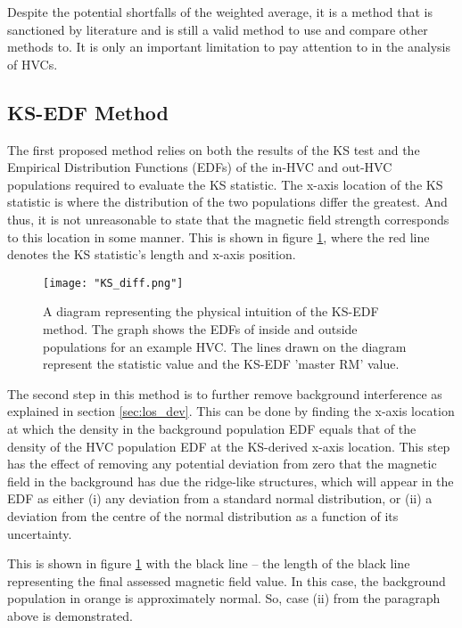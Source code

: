 Despite the potential shortfalls of the weighted average, it is a method that is sanctioned by literature and is still a valid method to use and compare other methods to. It is only an important limitation to pay attention to in the analysis of HVCs.


\subsection{KS-EDF Method}
\label{ssec:KS_EDF}

The first proposed method relies on both the results of the KS test and the Empirical Distribution Functions (EDFs) of the in-HVC and out-HVC populations required to evaluate the KS statistic. The x-axis location of the KS statistic is where the distribution of the two populations differ the greatest. And thus, it is not unreasonable to state that the magnetic field strength corresponds to this location in some manner. This is shown in figure \ref{fig:KSdiff}, where the red line denotes the KS statistic's length and x-axis position.


\begin{figure}
    \texttt{[image: "KS\_diff.png"]}
    \centering
    \caption{A diagram representing the physical intuition of the KS-EDF method. The graph shows the EDFs of inside and outside populations for an example HVC. The lines drawn on the diagram represent the statistic value and the KS-EDF 'master RM' value.}
    \label{fig:KSdiff}
\end{figure}

The second step in this method is to further remove background interference as explained in section \ref{sec:los_dev}. This can be done by finding the x-axis location at which the density in the background population EDF equals that of the density of the HVC population EDF at the KS-derived x-axis location. This step has the effect of removing any potential deviation from zero that the magnetic field in the background has due the ridge-like structures, which will appear in the EDF as either (i) any deviation from a standard normal distribution, or (ii) a deviation from the centre of the normal distribution as a function of its uncertainty.


This is shown in figure \ref{fig:KSdiff} with the black line – the length of the black line representing the final assessed magnetic field value. In this case, the background population in orange is approximately normal. So, case (ii) from the paragraph above is demonstrated.


